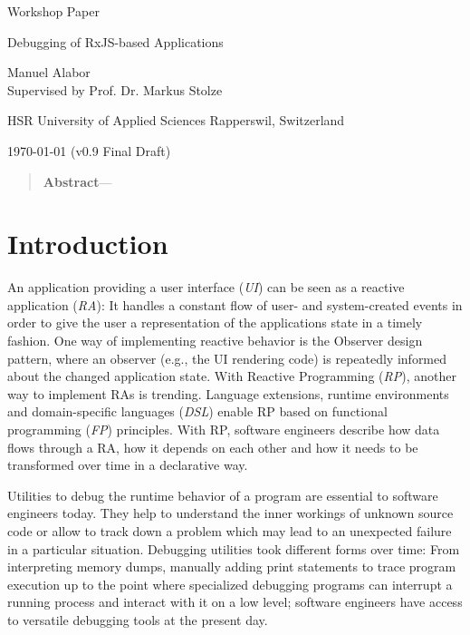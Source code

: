 \documentclass[12pt,a4paper]{article}
\newcommand{\version}{v0.9 Final Draft}
\begin{document}
\begin{centering}

	\Large{Workshop Paper}
	\par
	\Huge{Debugging of RxJS-based Applications}
	\par
	\vspace{2ex}

	\normalsize{
		Manuel Alabor\\
		Supervised by Prof. Dr. Markus Stolze\\
		\par
		\vspace{2ex}
		HSR University of Applied Sciences Rapperswil, Switzerland\\
		\par
		\vspace{2ex}
		\today{} (\version)
	}
	\par
	\vspace{2ex}

	\begin{quotation}
		\small{
			\noindent\textbf{Abstract}---
		}
		\par
		\vspace{4ex}
	\end{quotation}
\end{centering}

\section{Introduction}

An application providing a user interface (\emph{UI}) can be seen as a reactive application (\emph{RA})\cite{7827078}: It handles a constant flow of user- and system-created events in order to give the user a representation of the applications state in a timely fashion. One way of implementing reactive behavior is the Observer design pattern\cite{gamma1995design}, where an observer (e.g., the UI rendering code) is repeatedly informed about the changed application state. With Reactive Programming (\emph{RP}), another way to implement RAs is trending. Language extensions, runtime environments and domain-specific languages (\emph{DSL}) enable RP based on functional programming (\emph{FP}) principles. With RP, software engineers describe how data flows through a RA, how it depends on each other and how it needs to be transformed over time in a declarative way.

Utilities to debug the runtime behavior of a program are essential to software engineers today. They help to understand the inner workings of unknown source code or allow to track down a problem which may lead to an unexpected failure in a particular situation. Debugging utilities took different forms over time: From interpreting memory dumps, manually adding print statements to trace program execution up to the point where specialized debugging programs can interrupt a running process and interact with it on a low level; software engineers have access to versatile debugging tools at the present day.
\end{document}
